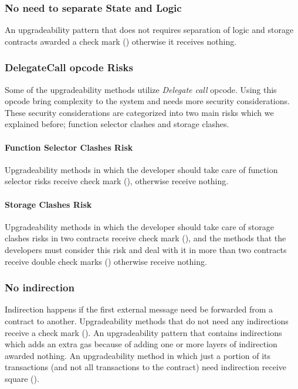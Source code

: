 \subsubsection{No need to separate State and Logic}
An upgradeability pattern that does not requires separation of logic and storage contracts awarded a check mark (\checkmark) otherwise it receives nothing.


\subsubsection{DelegateCall opcode Risks}
Some of the upgradeability methods utilize \textit{Delegate call} opcode. Using  this opcode bring complexity to the system and needs more security considerations. These security considerations are categorized into two main risks which we explained before; function selector clashes and storage clashes.

\paragraph{Function Selector Clashes Risk}
Upgradeability methods in which the developer should take care of function selector risks receive check mark (\checkmark), otherwise receive nothing. 

\paragraph{Storage Clashes Risk}
Upgradeability methods in which the developer should take care of storage clashes risks in two contracts receive check mark (\checkmark), and the methods that the developers must consider this risk and deal with it in more than two contracts receive double check marks (\checkmark\checkmark) otherwise receive nothing. 

 \subsubsection{No indirection}  
 Indirection happens if the first external message need be forwarded from a contract to another. Upgradeability methods that do not need any indirections receive a check mark (\checkmark). An upgradeability pattern that contains indirections which adds an extra gas because of adding one or more layers of indirection awarded nothing. An upgradeability method in which just a portion of its transactions (and not all transactions to the contract) need indirection receive square (\XBox). 

